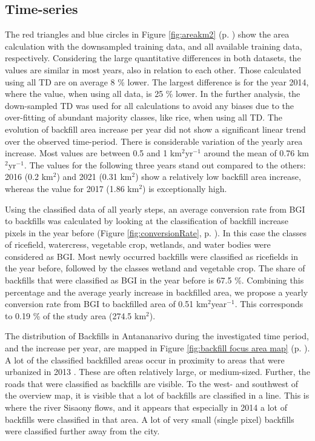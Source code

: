 \documentclass[11pt, A4, oneside]{report}
\begin{document}
\subsection{Time-series}
The red triangles and blue circles in Figure \ref{fig:areakm2} (p. \pageref{fig:areakm2}) show the area calculation with the downsampled training data, and all available training data, respectively. Considering the large quantitative differences in both datasets, the values are similar in most years, also in relation to each other. Those calculated using all TD are on average 8 \% lower. The largest difference is for the year 2014, where the value, when using all data, is 25 \% lower. In the further analysis, the down-sampled TD was used for all calculations to avoid any biases due to the over-fitting of abundant majority classes, like rice, when using all TD.
The evolution of backfill area increase per year did not show a significant linear trend over the observed time-period. There is considerable variation of the yearly area increase. Most values are between 0.5 and 1 km$^2$yr$^{-1}$ around the mean of 0.76 km$^2$yr$^{-1}$.
The values for the following three years stand out compared to the others: 2016 (0.2 km$^2$) and 2021 (0.31 km$^2$) show a relatively low backfill area increase, whereas the value for 2017 (1.86 km$^2$) is exceptionally high.

Using the classified data of all yearly steps, an average conversion rate from BGI to backfills was calculated by looking at the classification of backfill increase pixels in the year before (Figure \ref{fig:conversionRate}, p. \pageref{fig:conversionRate}). In this case the classes of ricefield, watercress, vegetable crop, wetlands, and water bodies were considered as BGI. Most newly occurred backfills were classified as ricefields in the year before, followed by the classes wetland and vegetable crop. The share of backfills that were classified as BGI in the year before is 67.5 \%. Combining this percentage and the average yearly increase in backfilled area, we propose a yearly conversion rate from BGI to backfilled area of 0.51 km$^2$year$^{-1}$. This corresponds to 0.19 \% of the study area (274.5 km$^2$).

The distribution of Backfills in Antananarivo during the investigated time period, and the increase per year, are mapped in Figure \ref{fig:backfill focus area map} (p. \pageref{fig:backfill focus area map}). A lot of the classified backfilled areas occur in proximity to areas that were urbanized in 2013 \parencite{Dupuy.2019}. These are often relatively large, or medium-sized. Further, the roads that were classified as backfills are visible. To the west- and southwest of the overview map, it is visible that a lot of backfills are classified in a line. This is where the river Sisaony flows, and it appears that especially in 2014 a lot of backfills were classified in that area. A lot of very small (single pixel) backfills were classified further away from the city.
\end{document}
